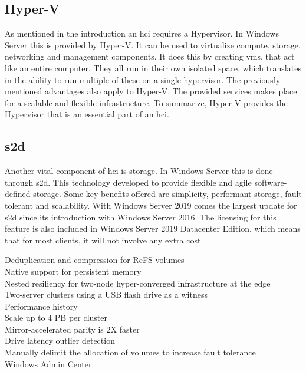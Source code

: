 \subsection{Hyper-V}
As mentioned in the introduction an \acrfull{hci} requires a Hypervisor. In Windows Server this is provided by Hyper-V. It can be used to virtualize compute, storage, networking and management components.  It does this by creating \acrshort{vm}s, that act like an entire computer. They all run in their own isolated space, which translates in the ability to run multiple of these on a single hypervisor. The previously mentioned advantages also apply to Hyper-V. The provided services makes place for a scalable and flexible infrastructure. To summarize, Hyper-V provides the Hypervisor that is an essential part of an \acrshort{hci}. \autocite{Short2016}
\subsection{\acrfull{s2d}}
Another vital component of \acrshort{hci} is storage. In Windows Server this is done through \acrshort{s2d}. This technology developed to provide flexible and agile software-defined storage. Some key benefits offered are simplicity, performant storage, fault tolerant and scalability. With Windows Server 2019 comes the largest update for \acrshort{s2d} since its introduction with Windows Server 2016. The licensing for this feature is also included in Windows Server 2019 Datacenter Edition, which means that for most clients, it will not involve any extra cost. \autocite{Gerend2018a}
\begin{description}
	\item [Deduplication and compression for ReFS volumes]
	\item [Native support for persistent memory]
	\item [Nested resiliency for two-node hyper-converged infrastructure at the edge]
	\item [Two-server clusters using a USB flash drive as a witness]
	\item [Performance history]
	\item [Scale up to 4 PB per cluster]
	\item [Mirror-accelerated parity is 2X faster]
	\item [Drive latency outlier detection]
	\item [Manually delimit the allocation of volumes to increase fault tolerance]
	\item [Windows Admin Center]
\end{description}
